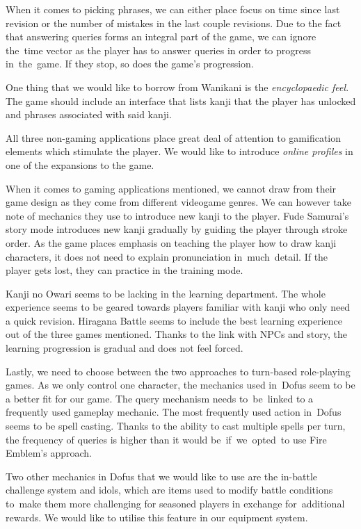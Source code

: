 \documentclass[thesis=B,english,hidelinks]{FITthesisXE}[2012/06/26]
\begin{document}
When it comes to picking phrases, we can either place focus on time since last revision or the number of mistakes in the last couple revisions. Due to the fact that answering queries forms an integral part of the game, we can ignore the~time vector as the player has to answer queries in order to progress in~the~game. If they stop, so does the game's progression.

One thing that we would like to borrow from Wanikani is the \emph{encyclopaedic feel}. The game should include an interface that lists kanji that the player has unlocked and phrases associated with said kanji.

All three non-gaming applications place great deal of attention to gamification elements which stimulate the player. We would like to introduce \emph{online profiles} in one of the expansions to the game.

When it comes to gaming applications mentioned, we cannot draw from their game design as they come from different videogame genres. We can however take note of mechanics they use to introduce new kanji to the player. Fude Samurai's story mode introduces new kanji gradually by guiding the player through stroke order. As the game places emphasis on teaching the player how to draw kanji characters, it does not need to explain pronunciation in~much~detail. If the player gets lost, they can practice in the training mode.

\newpage

Kanji no Owari seems to be lacking in the learning department. The whole experience seems to be geared towards players familiar with kanji who only need a quick revision. Hiragana Battle seems to include the best learning experience out of the three games mentioned. Thanks to the link with NPCs and story, the learning progression is gradual and does not feel forced.

Lastly, we need to choose between the two approaches to turn-based role-playing games. As we only control one character, the mechanics used in~Dofus seem to be a better fit for our game. The query mechanism needs to~be~linked to a frequently used gameplay mechanic. The most frequently used action in~Dofus seems to be spell casting. Thanks to the ability to cast multiple spells per turn, the frequency of queries is higher than it would be~if~we~opted~to use Fire Emblem's approach.

Two other mechanics in Dofus that we would like to use are the in-battle challenge system and idols, which are items used to modify battle conditions to~make them more challenging for seasoned players in exchange for~additional rewards. We would like to utilise this feature in our equipment system.
\end{document}
